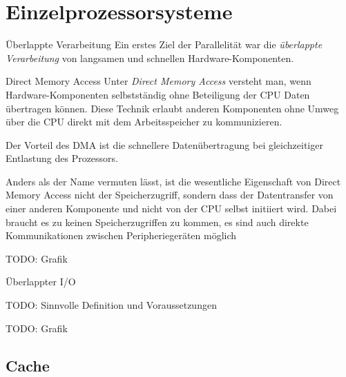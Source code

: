 
\section{Einzelprozessorsysteme}

\begin{defi}{Überlappte Verarbeitung}
    Ein erstes Ziel der Parallelität war die \emph{überlappte Verarbeitung} von langsamen und schnellen Hardware-Komponenten.
\end{defi}

\begin{example}{Direct Memory Access}
    Unter \emph{Direct Memory Access} versteht man, wenn Hardware-Komponenten selbstständig ohne Beteiligung der CPU Daten übertragen können.
    Diese Technik erlaubt anderen Komponenten ohne Umweg über die CPU direkt mit dem Arbeitsspeicher zu kommunizieren.

    Der Vorteil des DMA ist die schnellere Datenübertragung bei gleichzeitiger Entlastung des Prozessors.

    Anders als der Name vermuten lässt, ist die wesentliche Eigenschaft von Direct Memory Access nicht der Speicherzugriff, sondern dass der Datentransfer von einer anderen Komponente und nicht von der CPU selbst initiiert wird. Dabei braucht es zu keinen Speicherzugriffen zu kommen, es sind auch direkte Kommunikationen zwischen Peripheriegeräten möglich

    TODO: Grafik
\end{example}

\begin{defi}{Überlappter I/O}

    TODO: Sinnvolle Definition und Voraussetzungen

    TODO: Grafik
\end{defi}

\subsection{Cache}

